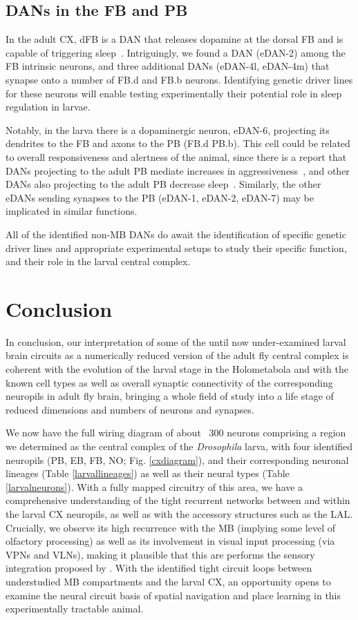         \subsection{DANs in the FB and PB}
        In the adult CX, dFB is a DAN that releases dopamine at the dorsal FB and is capable of triggering sleep~\citep{pimentel2016sleep}. Intriguingly, we found a DAN (eDAN-2) among the FB intrinsic neurons, and three additional DANs (eDAN-4l, eDAN-4m) that synapse onto a number of FB.d and FB.b neurons. Identifying genetic driver lines for these neurons will enable testing experimentally their potential role in sleep regulation in larvae.

        Notably, in the larva there is a dopaminergic neuron, eDAN-6, projecting its dendrites to the FB and axons to the PB (FB.d PB.b). This cell could be related to overall responsiveness and alertness of the animal, since there is a report that DANs projecting to the adult PB mediate increases in aggressiveness~\citep{alekseyenko2013DAN_PB}, and other DANs also projecting to the adult PB decrease sleep~\citep{tomita2021DAN_PB}. Similarly, the other eDANs sending synapses to the PB (eDAN-1, eDAN-2, eDAN-7) may be implicated in similar functions. 

        All of the identified non-MB DANs do await the identification of specific genetic driver lines and appropriate experimental setups to study their specific function, and their role in the larval central complex.

\section{Conclusion}
In conclusion, our interpretation of some of the until now under-examined larval brain circuits as a numerically reduced version of the adult fly central complex is coherent with the evolution of the larval stage in the Holometabola and with the known cell types as well as overall synaptic connectivity of the corresponding neuropils in adult fly brain, bringing a whole field of study into a life stage of reduced dimensions and numbers of neurons and synapses.  

We now have the full wiring diagram of about ~300 neurons comprising a region we determined as the central complex of the \textit{Drosophila} larva, with four identified neuropils (PB, EB, FB, NO; Fig. \ref{cxdiagram}), and their corresponding neuronal lineages (Table \ref{larvallineages}) as well as their neural types (Table \ref{larvalneurons}). With a fully mapped circuitry of this area, we have a comprehensive understanding of the tight recurrent networks between and within the larval CX neuropils, as well as with the accessory structures such as the LAL. Crucially, we observe its high recurrence with the MB (implying some level of olfactory processing) as well as its involvement in visual input processing (via VPNs and VLNs), making it plausible that this are performs the sensory integration proposed by \citep{gepner2015computations}. With the identified tight circuit loops between understudied MB compartments and the larval CX, an opportunity opens to examine the neural circuit basis of spatial navigation and place learning in this experimentally tractable animal. 

